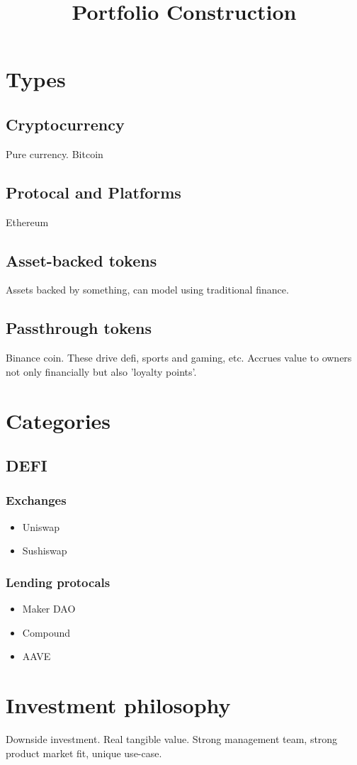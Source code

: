 \documentclass{../notes}
\title{Portfolio Construction}
\begin{document}
\maketitle

\section{Types}

\subsection{Cryptocurrency}
Pure currency. Bitcoin

\subsection{Protocal and Platforms}
Ethereum

\subsection{Asset-backed tokens}
Assets backed by something, can model using traditional finance. 

\subsection{Passthrough tokens}
Binance coin. These drive defi, sports and gaming, etc. Accrues value to owners not only financially but also 'loyalty points'. 

\section{Categories}

\subsection{DEFI}
\subsubsection{Exchanges}
\begin{itemize}
    \item Uniswap
    \item Sushiswap
\end{itemize}

\subsubsection{Lending protocals}
\begin{itemize}
    \item Maker DAO
    \item Compound
    \item AAVE
\end{itemize}


\section{Investment philosophy}
Downside investment. Real tangible value. 
Strong management team, strong product market fit, unique use-case. 
\end{document}
